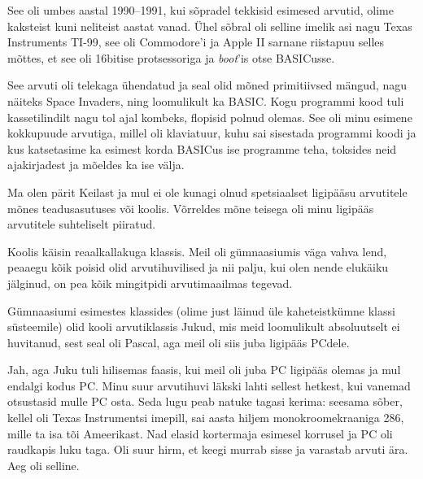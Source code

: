 See oli umbes aastal 1990--1991, kui sõpradel tekkisid esimesed arvutid, 
olime kaksteist kuni neliteist aastat vanad. Ühel sõbral oli selline 
imelik asi nagu Texas Instruments TI-99, see oli Commodore'i ja Apple 
II sarnane riistapuu selles mõttes, et see oli 16bitise protsessoriga ja 
\emph{boot}'is otse BASICusse. 

See arvuti oli telekaga ühendatud ja seal olid mõned primitiivsed mängud, nagu näiteks 
Space Invaders, ning 
loomulikult ka BASIC. Kogu programmi kood tuli kassetilindilt nagu tol 
ajal kombeks, flopisid polnud olemas. See oli minu esimene kokkupuude 
arvutiga, millel oli klaviatuur, kuhu sai sisestada programmi koodi ja 
kus katsetasime ka esimest korda BASICus ise programme teha, toksides 
neid ajakirjadest ja mõeldes ka ise välja. 


Ma olen pärit Keilast ja mul ei ole kunagi olnud 
spetsiaalset ligipääsu arvutitele mõnes teadusasutuses või koolis. Võrreldes mõne teisega oli minu ligipääs arvutitele suhteliselt piiratud.


Koolis käisin reaalkallakuga klassis. Meil oli 
gümnaasiumis väga vahva lend, peaaegu kõik poisid olid 
arvutihuvilised ja nii palju, kui olen nende elukäiku jälginud, on 
pea kõik mingitpidi arvutimaailmas tegevad.


Gümnaasiumi esimestes klassides (olime just 
läinud üle kaheteistkümne klassi süsteemile) olid kooli arvutiklassis 
Jukud, mis meid loomulikult absoluutselt ei huvitanud, sest
seal oli Pascal, aga meil oli siis juba ligipääs PCdele.


Jah, aga Juku tuli hilisemas faasis, kui meil oli 
juba PC ligipääs olemas ja mul endalgi kodus PC. Minu 
suur arvutihuvi läkski lahti sellest hetkest, kui vanemad otsustasid mulle 
PC osta. Seda lugu peab natuke tagasi kerima: seesama sõber, 
kellel oli Texas Instrumentsi imepill, sai aasta hiljem monokroomekraaniga
286, mille ta isa tõi Ameerikast. Nad elasid
kortermaja esimesel korrusel ja PC oli raudkapis luku taga. Oli suur hirm, et 
keegi murrab sisse ja varastab arvuti ära. Aeg oli selline.

